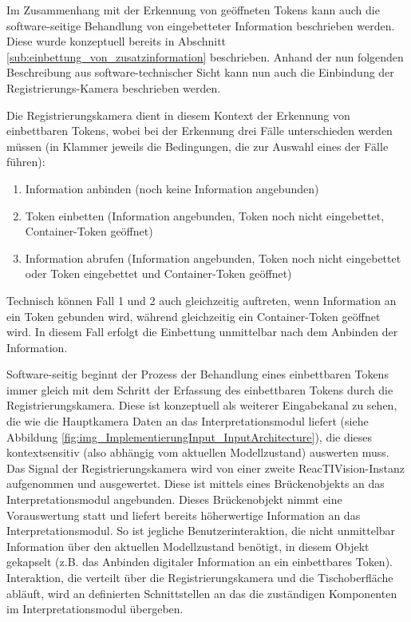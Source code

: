 Im Zusammenhang mit der Erkennung von geöffneten Tokens kann auch die software-seitige Behandlung von eingebetteter Information beschrieben werden. Diese wurde konzeptuell bereits in Abschnitt \ref{sub:einbettung_von_zusatzinformation} beschrieben. Anhand der nun folgenden Beschreibung aus software-technischer Sicht kann nun auch die Einbindung der Registrierungs-Kamera beschrieben werden.

Die Registrierungskamera dient in diesem Kontext der Erkennung von einbettbaren Tokens, wobei bei der Erkennung drei Fälle unterschieden werden müssen (in Klammer jeweils die Bedingungen, die zur Auswahl eines der Fälle führen):
\begin{enumerate}
	\item Information anbinden (noch keine Information angebunden)
	\item Token einbetten (Information angebunden, Token noch nicht eingebettet, Container-Token geöffnet)
	\item Information abrufen (Information angebunden, Token noch nicht eingebettet oder Token eingebettet und Container-Token geöffnet)
\end{enumerate}
Technisch können Fall 1 und 2 auch gleichzeitig auftreten, wenn Information an ein Token gebunden wird, während gleichzeitig ein Container-Token geöffnet wird. In diesem Fall erfolgt die Einbettung unmittelbar nach dem Anbinden der Information.

Software-seitig beginnt der Prozess der Behandlung eines einbettbaren Tokens immer gleich mit dem Schritt der Erfassung des einbettbaren Tokens durch die Registrierungskamera. Diese ist konzeptuell als weiterer Eingabekanal zu sehen, die wie die Hauptkamera Daten an das Interpretationsmodul liefert (siehe Abbildung \ref{fig:img_ImplementierungInput_InputArchitecture}), die dieses kontextsensitiv (also abhängig vom aktuellen Modellzustand) auswerten muss. Das Signal der Registrierungskamera wird von einer zweite ReacTIVision-Instanz aufgenommen und ausgewertet. Diese ist mittels eines Brückenobjekts an das Interpretationsmodul angebunden. Dieses Brückenobjekt nimmt eine Vorauswertung statt und liefert bereits höherwertige Information an das Interpretationsmodul. So ist jegliche Benutzerinteraktion, die nicht unmittelbar Information über den aktuellen Modellzustand benötigt, in diesem Objekt gekapselt (z.B. das Anbinden digitaler Information an ein einbettbares Token). Interaktion, die verteilt über die Registrierungskamera und die Tischoberfläche abläuft, wird an definierten Schnittstellen an das die zuständigen Komponenten im Interpretationsmodul übergeben.

